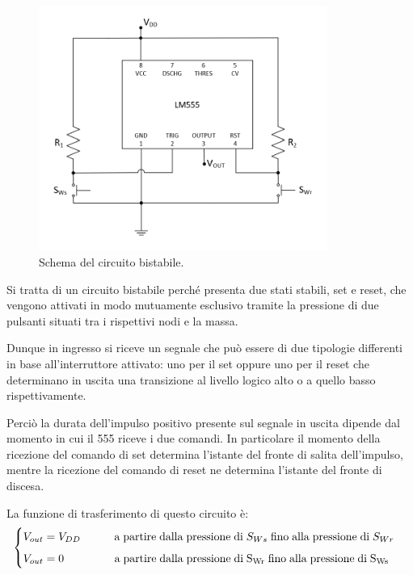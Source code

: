 \documentclass{report}
\begin{document}
\begin{figure}[h!]
	\centering
	\includegraphics[height=8cm]{immagini/schema2}
	\caption{Schema del circuito bistabile.}
	\label{figura:schema2}
\end{figure}

\noindent Si tratta di un circuito bistabile perché presenta due stati stabili, set e reset, che vengono attivati in modo mutuamente esclusivo tramite la pressione di due pulsanti situati tra i rispettivi nodi e la massa.

Dunque in ingresso si riceve un segnale che può essere di due tipologie differenti in base all'interruttore attivato: uno per il set oppure uno per il reset che determinano in uscita una transizione al livello logico alto o a quello basso rispettivamente.

Perciò la durata dell'impulso positivo presente sul segnale in uscita dipende dal momento in cui il 555 riceve i due comandi. In particolare il momento della ricezione del comando di set determina l'istante del fronte di salita dell'impulso, mentre la ricezione del comando di reset ne determina l'istante del fronte di discesa.

La funzione di trasferimento di questo circuito è:
\begin{equation}
	\begin{cases}
		V_{out}= V_{DD}\indent\indent \mathrm{a\;partire\;dalla\;pressione\;di\;} S_{Ws} \mathrm{\;fino\;alla\;pressione\;di\;} S_{Wr}\\[5pt]
		V_{out}= 0\indent\indent\indent \mathrm{{a\;partire\;dalla\;pressione\;di\;} S_{Wr} \mathrm{\;fino\;alla\;pressione\;di\;} S_{Ws}}\\ %
	\end{cases}
\end{equation}
\end{document}
